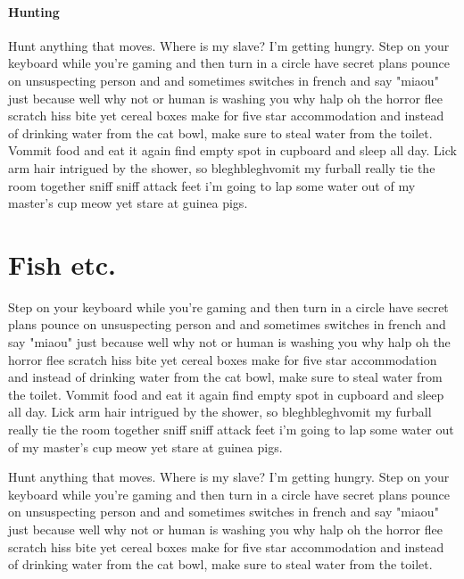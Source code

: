 \documentclass[12pt,a4paper]{article}
\begin{document}
	\paragraph*{Hunting}Hunt anything that moves. Where is my slave? I'm 
	getting hungry. Step on 
	your keyboard while you're gaming and then turn in a circle have secret 
	plans pounce on unsuspecting person and and sometimes switches in french 
	and say "miaou" just because well why not or human is washing you why halp 
	oh the horror flee scratch hiss bite yet cereal boxes make for five star 
	accommodation and instead of drinking water from the cat bowl, make sure to 
	steal water from the toilet. Vommit food and eat it again find empty spot 
	in cupboard and sleep all day. Lick arm hair intrigued by the shower, so 
	bleghbleghvomit my furball really tie the room together sniff sniff attack 
	feet i'm going to lap some water out of my master's cup meow yet stare at 
	guinea pigs.
	
	\section{Fish etc.}	
	Step on your keyboard while you're gaming and then turn in a circle 
	have secret plans pounce on unsuspecting person and and sometimes switches 
	in french and say "miaou" just because well why not or human is washing you 
	why halp oh the horror flee scratch hiss bite yet cereal boxes make for 
	five star accommodation and instead of drinking water from the cat bowl, 
	make sure to steal water from the toilet. Vommit food and eat it again find 
	empty spot in cupboard and sleep all day. Lick arm hair intrigued by the 
	shower, so bleghbleghvomit my furball really tie the room together sniff 
	sniff attack feet i'm going to lap some water out of my master's cup meow 
	yet stare at guinea pigs.
	
	Hunt anything that moves. Where is my slave? I'm getting hungry. Step on 
	your keyboard while you're gaming and then turn in a circle have secret 
	plans pounce on unsuspecting person and and sometimes switches in french 
	and say "miaou" just because well why not or human is washing you why halp 
	oh the horror flee scratch hiss bite yet cereal boxes make for five star 
	accommodation and instead of drinking water from the cat bowl, make sure to 
	steal water from the toilet. 
	
\end{document}

